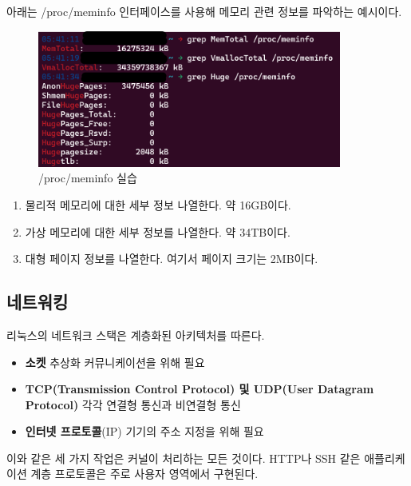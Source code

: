 \begin{flushleft}
    아래는 /proc/meminfo 인터페이스를 사용해 메모리 관련 정보를 파악하는 예시이다.
\end{flushleft}

\begin{figure}[h]
    \centering
    \includegraphics[width=10cm]{resource/mem-example.png}
    \caption{/proc/meminfo 실습}
\end{figure}

\begin{enumerate}
    \item 물리적 메모리에 대한 세부 정보 나열한다. 약 16GB이다.
    \item 가상 메모리에 대한 세부 정보를 나열한다. 약 34TB이다.
    \item 대형 페이지 정보를 나열한다. 여기서 페이지 크기는 2MB이다.
\end{enumerate}
\newpage

\subsection{네트워킹}
리눅스의 네트워크 스택은 계층화된 아키텍처를 따른다.

\begin{itemize}
    \item \textbf{소켓}\newline
        추상화 커뮤니케이션을 위해 필요
    \item \textbf{TCP(Transmission Control Protocol) 및 UDP(User Datagram Protocol)}\newline
        각각 연결형 통신과 비연결형 통신
    \item \textbf{인터넷 프로토콜}(IP)\newline
        기기의 주소 지정을 위해 필요
\end{itemize}

\begin{flushleft}
    이와 같은 세 가지 작업은 커널이 처리하는 모든 것이다.
    HTTP나 SSH 같은 애플리케이션 계층 프로토콜은 주로 사용자 영역에서 구현된다.
\end{flushleft}

